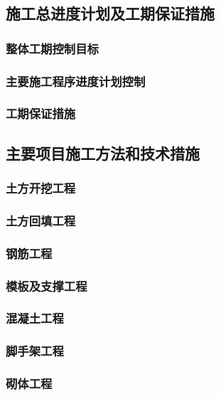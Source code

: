 \subsection{施工总进度计划及工期保证措施}
\subsubsection{整体工期控制目标}
\subsubsection{主要施工程序进度计划控制}
\subsubsection{工期保证措施}
\subsection{主要项目施工方法和技术措施}
\subsubsection{土方开挖工程}
\subsubsection{土方回填工程}
\subsubsection{钢筋工程}
\subsubsection{模板及支撑工程}
\subsubsection{混凝土工程}
\subsubsection{脚手架工程}
\subsubsection{砌体工程}
